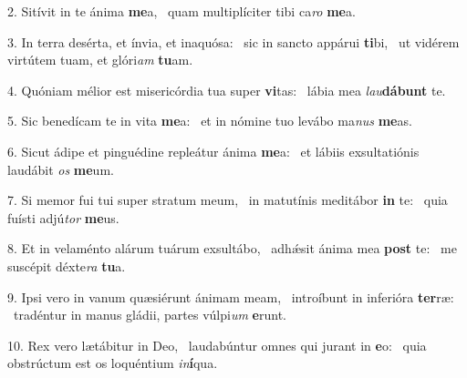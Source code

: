 2. Sitívit in te ánima \textbf{me}a, \ast\  quam multiplíciter tibi ca\textit{ro} \textbf{me}a.\

3. In terra desérta, et ínvia, et inaquósa: \dag\  sic in sancto appárui \textbf{ti}bi, \ast\  ut vidérem virtútem tuam, et glóri\textit{am} \textbf{tu}am.\

4. Quóniam mélior est misericórdia tua super \textbf{vi}tas: \ast\  lábia mea \textit{lau}\textbf{dá}\textbf{bunt} te.\

5. Sic benedícam te in vita \textbf{me}a: \ast\  et in nómine tuo levábo ma\textit{nus} \textbf{me}as.\

6. Sicut ádipe et pinguédine repleátur ánima \textbf{me}a: \ast\  et lábiis exsultatiónis laudábit \textit{os} \textbf{me}um.\

7. Si memor fui tui super stratum meum, \dag\  in matutínis meditábor \textbf{in} te: \ast\  quia fuísti adjú\textit{tor} \textbf{me}us.\

8. Et in velaménto alárum tuárum exsultábo, \dag\  adhǽsit ánima mea \textbf{post} te: \ast\  me suscépit déxte\textit{ra} \textbf{tu}a.\

9. Ipsi vero in vanum quæsiérunt ánimam meam, \dag\  introíbunt in inferióra \textbf{ter}ræ: \ast\  tradéntur in manus gládii, partes vúlpi\textit{um} \textbf{e}runt.\

10. Rex vero lætábitur in Deo, \dag\  laudabúntur omnes qui jurant in \textbf{e}o: \ast\  quia obstrúctum est os loquéntium \textit{in}\textbf{í}qua.\

